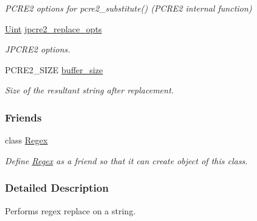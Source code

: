 \begin{DoxyCompactItemize}
\begin{DoxyCompactList}\small\item\em P\+C\+R\+E2 options for pcre2\+\_\+substitute() (P\+C\+R\+E2 internal function) \end{DoxyCompactList}\item 
\hyperlink{namespacejpcre2_a078242d38221a13fb3543b9edd78c099}{Uint} \hyperlink{classjpcre2_1_1RegexReplace_acf13bcb16918df4b7bcaa7e49a1c7d59}{jpcre2\+\_\+replace\+\_\+opts}\hypertarget{classjpcre2_1_1RegexReplace_acf13bcb16918df4b7bcaa7e49a1c7d59}{}\label{classjpcre2_1_1RegexReplace_acf13bcb16918df4b7bcaa7e49a1c7d59}

\begin{DoxyCompactList}\small\item\em J\+P\+C\+R\+E2 options. \end{DoxyCompactList}\item 
P\+C\+R\+E2\+\_\+\+S\+I\+ZE \hyperlink{classjpcre2_1_1RegexReplace_a44abce541819ceb51e342411b48e95cb}{buffer\+\_\+size}\hypertarget{classjpcre2_1_1RegexReplace_a44abce541819ceb51e342411b48e95cb}{}\label{classjpcre2_1_1RegexReplace_a44abce541819ceb51e342411b48e95cb}

\begin{DoxyCompactList}\small\item\em Size of the resultant string after replacement. \end{DoxyCompactList}\end{DoxyCompactItemize}
\subsubsection*{Friends}
\begin{DoxyCompactItemize}
\item 
class \hyperlink{classjpcre2_1_1RegexReplace_a1f6f7620b7d2218c6c2a6a47f432ea6a}{Regex}\hypertarget{classjpcre2_1_1RegexReplace_a1f6f7620b7d2218c6c2a6a47f432ea6a}{}\label{classjpcre2_1_1RegexReplace_a1f6f7620b7d2218c6c2a6a47f432ea6a}

\begin{DoxyCompactList}\small\item\em Define \hyperlink{classjpcre2_1_1Regex}{Regex} as a friend so that it can create object of this class. \end{DoxyCompactList}\end{DoxyCompactItemize}


\subsubsection{Detailed Description}
Performs regex replace on a string. 

